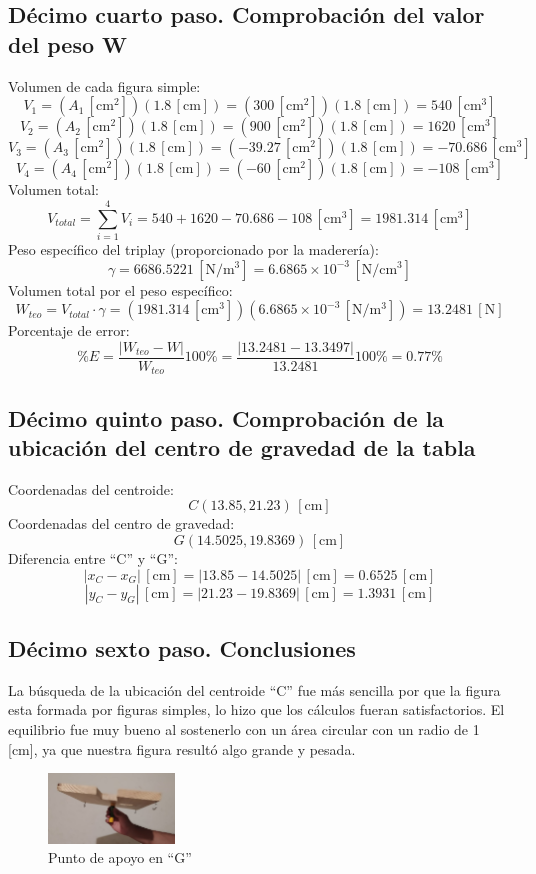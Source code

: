 \documentclass[12pt, titlepage]{report}
\newcommand{\unit}[1]{\ensuremath{\, \mathrm{#1}}}
\begin{document}
    \subsection*{Décimo cuarto paso. Comprobación del valor del peso W}
    Volumen de cada figura simple:
    $$V_1 = (A_1 \unit{[cm^2]})(1.8 \unit{[cm]}) = (300 \unit{[cm^2]})(1.8 \unit{[cm]}) = 540 \unit{[cm^3]}$$
    $$V_2 = (A_2 \unit{[cm^2]})(1.8 \unit{[cm]}) = (900 \unit{[cm^2]})(1.8 \unit{[cm]}) = 1620 \unit{[cm^3]}$$
    $$V_3 = (A_3 \unit{[cm^2]})(1.8 \unit{[cm]}) = (-39.27 \unit{[cm^2]})(1.8 \unit{[cm]}) = -70.686 \unit{[cm^3]}$$
    $$V_4 = (A_4 \unit{[cm^2]})(1.8 \unit{[cm]}) = (-60 \unit{[cm^2]})(1.8 \unit{[cm]}) = -108 \unit{[cm^3]}$$
    Volumen total: 
    $$V_{total}=\sum_{i = 1}^{4} V_{i} = 540 + 1620 - 70.686 - 108 \unit{[cm^3]} = 1981.314 \unit{[cm^3]}$$
    Peso específico del triplay (proporcionado por la maderería): 
    $$\gamma =  6686.5221 \unit{[N/m^3]} =  6.6865 \times 10^{-3} \unit{[N/cm^3]}$$
    Volumen total por el peso específico: 
    $$W_{teo}=V_{total}\cdot\gamma = (1981.314 \unit{[cm^3]})(6.6865 \times 10^{-3} \unit{[N/m^3]}) =  13.2481\unit{[N]}$$
    Porcentaje de error: $$\%E=\frac{|W_{teo} - W|}{W_{teo}}100\%=\frac{|13.2481 - 13.3497|}{13.2481}100\% = 0.77 \%$$

    \subsection*{Décimo quinto paso. Comprobación de la ubicación del centro de gravedad de la tabla}
    Coordenadas del centroide: 
    $$C(13.85, 21.23) \unit{[cm]}$$
    Coordenadas del centro de gravedad: 
    $$G(14.5025, 19.8369) \unit{[cm]}$$ 
    Diferencia entre ``C'' y ``G'': 
    $$|x_{C}-x_{G}| \unit{[cm]} = |13.85 - 14.5025| \unit{[cm]} = 0.6525 \unit{[cm]}$$
    $$|y_{C}-y_{G}| \unit{[cm]} = |21.23 - 19.8369| \unit{[cm]} = 1.3931 \unit{[cm]}$$

    \subsection*{Décimo sexto paso. Conclusiones}    
    La búsqueda de la ubicación del centroide ``C'' fue más sencilla por que la figura esta formada por figuras simples, lo hizo que los cálculos fueran satisfactorios. El equilibrio fue muy bueno al sostenerlo con un área circular con un radio de 1 [cm], ya que nuestra figura resultó algo grande y pesada. 

    \begin{figure}
        \centering
        \includegraphics[width=0.3\textwidth]{Equilibrio2.jpg}
        \caption{Punto de apoyo en ``G''}
    \end{figure}
\end{document}
